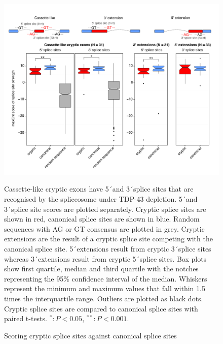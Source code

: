\begin{figure}[h!]
	\begin{center}
		\includegraphics[width=14cm]{Figures/03_cryptic_exons/Figure_6_splice_site_scoring.png}
	\end{center}
	\caption{Scoring cryptic splice sites against canonical splice sites}
		Cassette-like cryptic exons have 5\'\ and 3\'\ splice sites that are recognised by the spliceosome under TDP-43 depletion. 5\'\ and 3\'\ splice site scores are plotted separately. Cryptic splice sites are shown in red, canonical splice sites are shown in blue. Random sequences with AG or GT consensus are plotted in grey. Cryptic extensions are the result of a cryptic splice site competing with the canonical splice site. 5\'\ extensions result from cryptic 3\'\ splice sites whereas 3\'\ extensions result from cryptic 5\'\ splice sites. Box plots show first quartile, median and third quartile with the notches representing the 95\% confidence interval of the median. Whiskers represent the minimum and maximum values that fall within 1.5 times the interquartile range. Outliers are plotted as black dots. Cryptic splice sites are compared to canonical splice sites with paired t-tests. $^{*}: P < 0.05$, $^{**}: P < 0.001$.
\end{figure}

